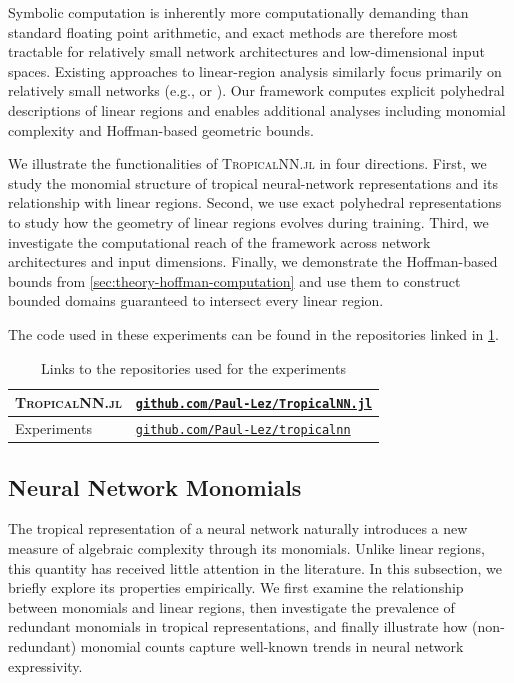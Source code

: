 \documentclass[10pt]{article}
\theoremstyle{definition}
\theoremstyle{remark}
\begin{document}
Symbolic computation is inherently more computationally demanding than standard floating point arithmetic, and exact methods are therefore most tractable for relatively small network architectures and low-dimensional input spaces. Existing approaches to linear-region analysis similarly focus primarily on relatively small networks (e.g., \cite{serra2018bounding} or \cite{piwek2023exact}).  Our framework computes explicit polyhedral descriptions of linear regions and enables additional analyses including monomial complexity and Hoffman-based geometric bounds.

We illustrate the functionalities of \textsc{TropicalNN.jl} in four directions. First, we study the monomial structure of tropical neural-network representations and
its relationship with linear regions. Second, we use exact polyhedral representations to study how the geometry of linear regions evolves during training. Third, we investigate the computational reach of the framework across network architectures and input dimensions. Finally, we demonstrate the Hoffman-based bounds from \cref{sec:theory-hoffman-computation} and use them to construct bounded domains guaranteed to
intersect every linear region.

The code used in these experiments can be found in the repositories linked in \cref{tab:links}.

\begin{table}[ht]
    \centering
    \begin{tabular}{|l|l|}
        \hline
       \textsc{TropicalNN.jl}  & \href{https://github.com/Paul-Lez/TropicalNN.jl}{\texttt{github.com/Paul-Lez/TropicalNN.jl}} \\
       \hline
       Experiments  & \href{https://github.com/Paul-Lez/tropicalnn}{\texttt{github.com/Paul-Lez/tropicalnn}} \\
       \hline
    \end{tabular}
    \caption{Links to the repositories used for the experiments}
    \label{tab:links}
\end{table}

\subsection{Neural Network Monomials}
The tropical representation of a neural network naturally introduces a new measure of algebraic complexity through its monomials. 
Unlike linear regions, this quantity has received little attention in the literature. In this subsection, we briefly explore its properties empirically.
We first examine the relationship between monomials and linear regions, then investigate the prevalence of redundant monomials in tropical representations, and finally illustrate how (non-redundant) monomial counts capture well-known trends in neural network expressivity.
\end{document}
